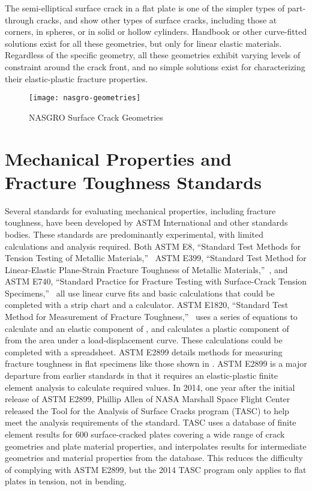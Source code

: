 The semi-elliptical surface crack in a flat plate is one of the simpler types of part-through cracks, and  show other types of surface cracks, including those at corners, in spheres, or in solid or hollow cylinders.
Handbook or other curve-fitted solutions exist for all these geometries, but only for linear elastic materials.
Regardless of the specific geometry, all these geometries exhibit varying levels of constraint around the crack front, and no simple solutions exist for characterizing their elastic-plastic fracture properties.
\begin{figure}[tbp]
\centering
\texttt{[image: nasgro-geometries]}
\caption[NASGRO Surface Crack Geometries]{\label{fig:nasgro-geometries} NASGRO Surface Crack Geometries \cite{nasgro2000}}
\end{figure}

\section{Mechanical Properties and Fracture Toughness Standards}

Several standards for evaluating mechanical properties, including fracture toughness, have been developed by ASTM International and other standards bodies.
These standards are predominantly experimental, with limited calculations and analysis required.
Both ASTM E8, ``Standard Test Methods for Tension Testing of Metallic Materials,''~\cite{astme8} ASTM E399, ``Standard Test Method for Linear-Elastic Plane-Strain Fracture Toughness \KIc of Metallic Materials,''~\cite{astme399}, and ASTM E740, ``Standard Practice for Fracture Testing with Surface-Crack Tension Specimens,''~\cite{astme740} all use linear curve fits and basic calculations that could be completed with a strip chart and a calculator.
ASTM E1820, ``Standard Test Method for Measurement of Fracture Toughness,''~\cite{astme1820} uses a series of equations to calculate \K and an elastic component of \J, and calculates a plastic component of \J from the area under a load-displacement curve. These calculations could be completed with a spreadsheet.
ASTM E2899 details methods for measuring fracture toughness in flat specimens like those shown in .
ASTM E2899 is a major departure from earlier standards in that it requires an elastic-plastic finite element analysis to calculate required \J values.
In 2014, one year after the initial release of ASTM E2899, Phillip Allen of NASA Marshall Space Flight Center released the Tool for the Analysis of Surface Cracks program (TASC) to help meet the analysis requirements of the standard.
TASC uses a database of finite element results for 600 surface-cracked plates covering a wide range of crack geometries and plate material properties, and interpolates results for intermediate geometries and material properties from the database.
This reduces the difficulty of complying with ASTM E2899, but the 2014 TASC program only applies to flat plates in tension, not in bending.

